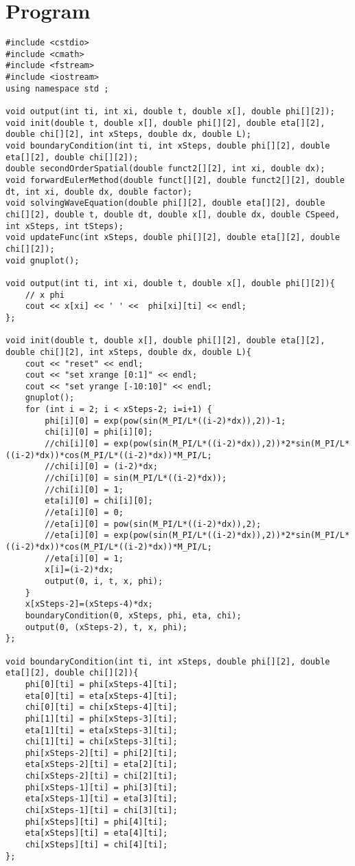 \documentclass[10pt,fleqn,reqno,a4paper]{article}
\begin{document}
\section{Program}
\begin{verbatim}
#include <cstdio>
#include <cmath>
#include <fstream>
#include <iostream>
using namespace std ;

void output(int ti, int xi, double t, double x[], double phi[][2]);
void init(double t, double x[], double phi[][2], double eta[][2], double chi[][2], int xSteps, double dx, double L);
void boundaryCondition(int ti, int xSteps, double phi[][2], double eta[][2], double chi[][2]);
double secondOrderSpatial(double funct2[][2], int xi, double dx);
void forwardEulerMethod(double funct[][2], double funct2[][2], double dt, int xi, double dx, double factor);
void solvingWaveEquation(double phi[][2], double eta[][2], double chi[][2], double t, double dt, double x[], double dx, double CSpeed, int xSteps, int tSteps);
void updateFunc(int xSteps, double phi[][2], double eta[][2], double chi[][2]);
void gnuplot();

void output(int ti, int xi, double t, double x[], double phi[][2]){
    // x phi
    cout << x[xi] << ' ' <<  phi[xi][ti] << endl;
};

void init(double t, double x[], double phi[][2], double eta[][2], double chi[][2], int xSteps, double dx, double L){
    cout << "reset" << endl;
    cout << "set xrange [0:1]" << endl;
    cout << "set yrange [-10:10]" << endl;
    gnuplot();
    for (int i = 2; i < xSteps-2; i=i+1) {
        phi[i][0] = exp(pow(sin(M_PI/L*((i-2)*dx)),2))-1;
        chi[i][0] = phi[i][0];
        //chi[i][0] = exp(pow(sin(M_PI/L*((i-2)*dx)),2))*2*sin(M_PI/L*((i-2)*dx))*cos(M_PI/L*((i-2)*dx))*M_PI/L;
        //chi[i][0] = (i-2)*dx;
        //chi[i][0] = sin(M_PI/L*((i-2)*dx));
        //chi[i][0] = 1;
        eta[i][0] = chi[i][0];
        //eta[i][0] = 0;
        //eta[i][0] = pow(sin(M_PI/L*((i-2)*dx)),2);
        //eta[i][0] = exp(pow(sin(M_PI/L*((i-2)*dx)),2))*2*sin(M_PI/L*((i-2)*dx))*cos(M_PI/L*((i-2)*dx))*M_PI/L;
        //eta[i][0] = 1;
        x[i]=(i-2)*dx;
        output(0, i, t, x, phi);
	}
	x[xSteps-2]=(xSteps-4)*dx;
    boundaryCondition(0, xSteps, phi, eta, chi);
    output(0, (xSteps-2), t, x, phi);
};

void boundaryCondition(int ti, int xSteps, double phi[][2], double eta[][2], double chi[][2]){
    phi[0][ti] = phi[xSteps-4][ti];
    eta[0][ti] = eta[xSteps-4][ti];
    chi[0][ti] = chi[xSteps-4][ti];
    phi[1][ti] = phi[xSteps-3][ti];
    eta[1][ti] = eta[xSteps-3][ti];
    chi[1][ti] = chi[xSteps-3][ti];
    phi[xSteps-2][ti] = phi[2][ti];
    eta[xSteps-2][ti] = eta[2][ti];
    chi[xSteps-2][ti] = chi[2][ti];
    phi[xSteps-1][ti] = phi[3][ti];
    eta[xSteps-1][ti] = eta[3][ti];
    chi[xSteps-1][ti] = chi[3][ti];
    phi[xSteps][ti] = phi[4][ti];
    eta[xSteps][ti] = eta[4][ti];
    chi[xSteps][ti] = chi[4][ti];
};


\end{verbatim}
\end{document}
